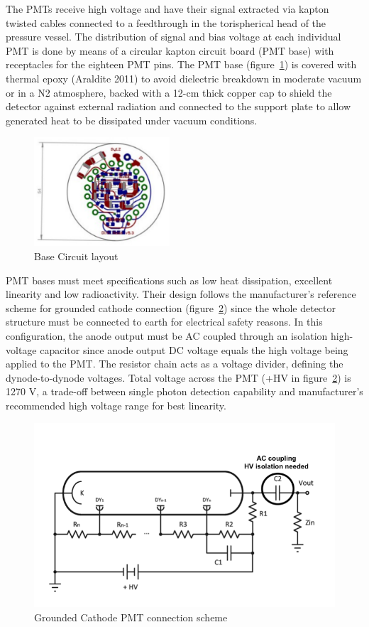 \documentclass[a4paper, 10pt, oneside, twocolumn, 3p]{elsarticle}
\begin{document}
\par The PMTs receive high voltage and have their signal extracted via kapton twisted cables connected to a feedthrough in the torispherical head of the pressure vessel. The distribution of signal and bias voltage at each individual PMT is done by means of a circular kapton circuit board (PMT base) with receptacles for the eighteen PMT pins. The PMT base (figure~\ref{fig:7C_layout}) is covered with thermal epoxy (Araldite 2011\textregistered) to avoid dielectric breakdown in moderate vacuum or in a N2 atmosphere, backed with a 12-cm thick copper cap to shield the detector against external radiation and connected to the support plate to allow generated heat to be dissipated under vacuum conditions.

\begin{figure}
  \begin{center}
    \includegraphics[width=0.45\textwidth]{./figures/7C_layout.pdf}
    \caption{Base Circuit layout}
    \label{fig:7C_layout}
  \end{center}
\end{figure}


\par PMT bases must meet specifications such as low heat dissipation, excellent linearity and low radioactivity. Their design follows the manufacturer's reference scheme for grounded cathode connection (figure~\ref{fig:grounded_cathode}) since the whole detector structure must be connected to earth for electrical safety reasons. In this configuration, the anode output must be AC coupled through an isolation high-voltage capacitor since anode output DC voltage equals the high voltage being applied to the PMT. The resistor chain acts as a voltage divider, defining the dynode-to-dynode voltages. Total voltage across the PMT (+HV in figure~\ref{fig:grounded_cathode}) is 1270 V, a trade-off between single photon detection capability and manufacturer's recommended high voltage range for best linearity.

\begin{figure} [H]
	\begin{center}
		\includegraphics[width=.4\textwidth]{./figures/AC_diagram.png}
		\caption{Grounded Cathode PMT connection scheme}
		\label{fig:grounded_cathode}
	\end{center}
\end{figure}
\end{document}
